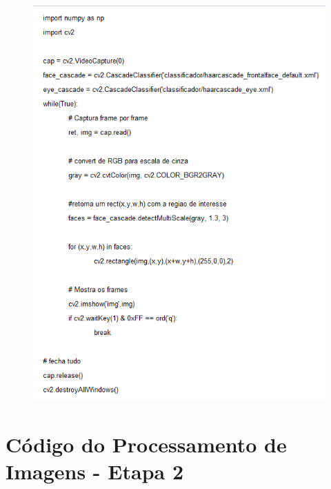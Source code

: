 \begin{apendicesenv}
\begin{figure}[H]
    \centering
      \includegraphics[scale=1.0]{figuras/img1.png}
    \label{img1}
\end{figure}

\chapter{Código do Processamento de Imagens - Etapa 2}


\end{apendicesenv}
